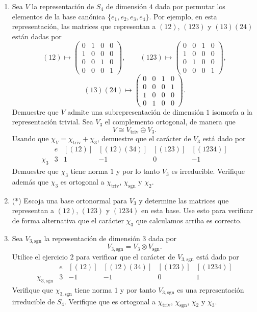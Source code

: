 \documentclass[10pt,a4paper]{article}
\begin{document}
{\begin{enumerate}[label=(\alph*),leftmargin=2.4em]
\item Sea $V$ la representación de $S_4$ de dimensión $4$ dada por permutar los elementos de
la base canónica $\{e_1, e_2, e_3, e_4\}$. Por ejemplo, en esta representación, las matrices
que representan a $(12)$, $(123)$ y $(13)(24)$ están dadas por
\[
  (12) \mapsto
  \begin{pmatrix}
    0 & 1 & 0 & 0 \\
    1 & 0 & 0 & 0 \\
    0 & 0 & 1 & 0 \\
    0 & 0 & 0 & 1
  \end{pmatrix},
  \qquad
  (123) \mapsto
  \begin{pmatrix}
    0 & 0 & 1 & 0 \\
    1 & 0 & 0 & 0 \\
    0 & 1 & 0 & 0 \\
    0 & 0 & 0 & 1
  \end{pmatrix},
\]
\[
  (13)(24) \mapsto
  \begin{pmatrix}
    0 & 0 & 1 & 0 \\
    0 & 0 & 0 & 1 \\
    1 & 0 & 0 & 0 \\
    0 & 1 & 0 & 0
  \end{pmatrix}.
\]
Demuestre que $V$ admite una subrepresentación de dimensión $1$ isomorfa a la representación
trivial. Sea $V_3$ el complemento ortogonal, de manera que
\[
  V \cong V_{\mathrm{triv}} \oplus V_3.
\]
Usando que $\chi_V = \chi_{\mathrm{triv}} + \chi_3$, demuestre que el carácter de $V_3$ está dado por
\[
  \begin{array}{c|ccccc}
    & e & [(12)] & [(12)(34)] & [(123)] & [(1234)] \\
    \chi_3 & 3 & 1 & -1 & 0 & -1
  \end{array}
\]
Demuestre que $\chi_3$ tiene norma $1$ y por lo tanto $V_3$ es irreducible. Verifique además
que $\chi_3$ es ortogonal a $\chi_{\mathrm{triv}}$, $\chi_{\mathrm{sgn}}$ y $\chi_2$.

\item (*) Escoja una base ortonormal para $V_3$ y determine las matrices que representan a
$(12)$, $(123)$ y $(1234)$ en esta base. Use esto para verificar de forma alternativa que el
carácter $\chi_3$ que calculamos arriba es correcto.

\item Sea $V_{3,\mathrm{sgn}}$ la representación de dimensión $3$ dada por
\[
  V_{3,\mathrm{sgn}} = V_3 \otimes V_{\mathrm{sgn}}.
\]
Utilice el ejercicio $2$ para verificar que el carácter de $V_{3,\mathrm{sgn}}$ está dado por
\[
  \begin{array}{c|ccccc}
    & e & [(12)] & [(12)(34)] & [(123)] & [(1234)] \\
    \chi_{3,\mathrm{sgn}} & 3 & -1 & -1 & 0 & 1
  \end{array}
\]
Verifique que $\chi_{3,\mathrm{sgn}}$ tiene norma $1$ y por tanto $V_{3,\mathrm{sgn}}$ es una
representación irreducible de $S_4$. Verifique que es ortogonal a $\chi_{\mathrm{triv}}$,
$\chi_{\mathrm{sgn}}$, $\chi_2$ y $\chi_3$.


\end{enumerate}}
\end{document}
